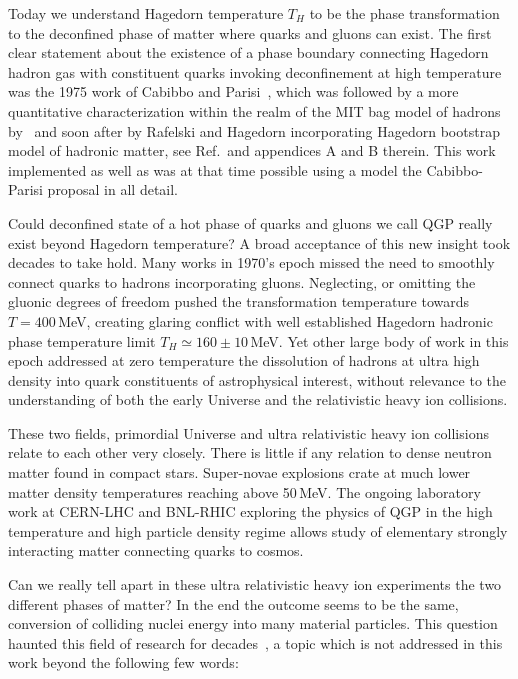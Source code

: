 Today we understand Hagedorn temperature $T_H$ to be the phase transformation to the deconfined phase of matter where quarks and gluons can exist. The first clear statement about the existence of a phase boundary connecting Hagedorn hadron gas with constituent quarks invoking deconfinement at high temperature was the 1975 work of Cabibbo and Parisi~\cite{Cabibbo:1975ig}, which was followed by a more quantitative characterization within the realm of the MIT bag model of hadrons by~\cite{Chin:1978gj} and soon after by Rafelski and Hagedorn incorporating Hagedorn bootstrap model of hadronic matter, see Ref.\,\cite{Rafelski:2015cxa} and appendices A and B therein. This work implemented as well as was at that time possible using a model the Cabibbo-Parisi proposal in all detail.

Could deconfined state of a hot phase of quarks and gluons we call QGP really exist beyond Hagedorn temperature? A broad acceptance of this new insight took decades to take hold. Many works in 1970's epoch missed the need to smoothly connect quarks to hadrons incorporating gluons. Neglecting, or omitting the gluonic degrees of freedom pushed the transformation temperature towards $T=400$\,MeV, creating glaring conflict with well established Hagedorn hadronic phase temperature limit $T_H\simeq 160\pm 10$\,MeV. Yet other large body of work in this epoch addressed at zero temperature the dissolution of hadrons at ultra high density into quark constituents of astrophysical interest, without relevance to the understanding of both the early Universe and the relativistic heavy ion collisions.

These two fields, primordial Universe and ultra relativistic heavy ion collisions relate to each other very closely. There is little if any relation to dense neutron matter found in compact stars. Super-novae explosions crate at much lower matter density temperatures reaching above 50\,MeV. The ongoing laboratory work at CERN-LHC and BNL-RHIC exploring the physics of QGP in the high temperature and high particle density regime allows study of elementary strongly interacting matter  connecting quarks to cosmos.
 
Can we really tell apart in these ultra relativistic heavy ion experiments the  two different phases of matter? In the end the outcome seems to be the same, conversion of colliding nuclei energy into many material particles. This question haunted this field of research for decades~\cite{Rafelski:2015cxa,Harris:2024aov}, a topic which is not addressed in this work beyond the following few words: 


